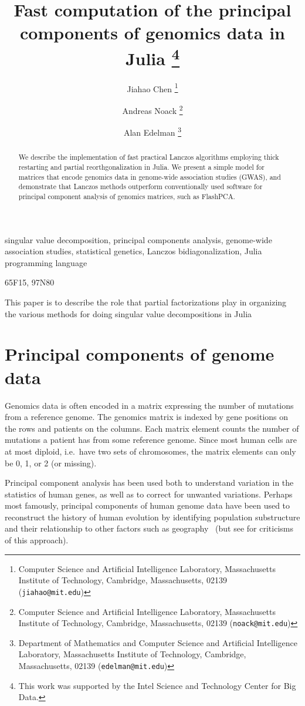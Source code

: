 \documentclass[final,leqno]{siamltex1213}
\title{Fast computation of the principal components of genomics data in Julia
    \thanks{This
        work was supported by the Intel Science and Technology Center for Big Data.
	}}
\author{%
    Jiahao Chen
    \thanks{Computer Science and Artificial Intelligence Laboratory,
           Massachusetts Institute of Technology,
           Cambridge, Massachusetts, 02139 ({\tt jiahao@mit.edu})}
    \and
    Andreas Noack
    \thanks{Computer Science and Artificial Intelligence Laboratory,
            Massachusetts Institute of Technology,
            Cambridge, Massachusetts, 02139 ({\tt noack@mit.edu})}
    \and
    Alan Edelman
    \thanks{Department of Mathematics and Computer Science and Artificial Intelligence Laboratory,
            Massachusetts Institute of Technology,
            Cambridge, Massachusetts, 02139 ({\tt edelman@mit.edu})}
}
\begin{document}
\maketitle

\begin{abstract}
We describe the implementation of fast practical Lanczos algorithms employing
thick restarting and partial reorthgonalization in Julia. We present a simple
model for matrices that encode genomics data in genome-wide association studies
(GWAS), and demonstrate that Lanczos methods outperform conventionally used
software for principal component analysis of genomics matrices, such as FlashPCA.
\end{abstract}

\begin{keywords}
    singular value decomposition,
    principal components analysis,
    genome-wide association studies,
    statistical genetics,
    Lanczos bidiagonalization,
    Julia programming language
\end{keywords}

\begin{AMS}
    65F15, 97N80
\end{AMS}

\pagestyle{myheadings}
\thispagestyle{plain}

\listoftodos

This paper is to describe the role that partial factorizations play in
organizing the various methods for doing singular value decompositions in
Julia


\section{Principal components of genome data}

Genomics data is often encoded in a matrix expressing the number of mutations
from a reference genome.
The genomics matrix is indexed by gene positions on the rows and patients on the
columns. Each matrix element counts the number of mutations a patient has from
some reference genome. Since most human cells are at most diploid, i.e.\ have
two sets of chromosomes,
the matrix elements can only be 0, 1, or 2 (or missing).

Principal component analysis has been used both to understand variation in
the statistics of human genes, as well as to correct for unwanted variations.
Perhaps most famously, principal components of human genome data have been used
to reconstruct the history of human evolution by identifying population
substructure and their relationship to other factors such as geography~\cite{Menozzi1978,Cavalli1994}
(but see \cite{Novembre2008} for criticisms of this approach).
\end{document}
